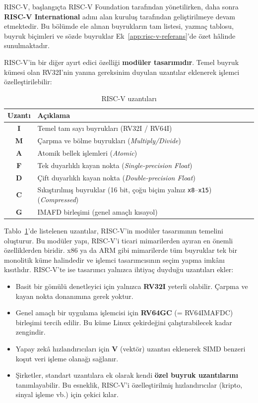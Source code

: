RISC-V, başlangıçta RISC-V Foundation tarafından yönetilirken, daha sonra \textbf{RISC-V International} adını alan kuruluş tarafından geliştirilmeye devam etmektedir. Bu bölümde ele alınan buyrukların tam listesi, yazmaç tablosu, buyruk biçimleri ve sözde buyruklar Ek~\ref{app:risc-v-referans}'de özet hâlinde sunulmaktadır.

RISC-V'in bir diğer ayırt edici özelliği \textbf{modüler tasarımıdır}. Temel buyruk kümesi olan RV32I'nin yanına gereksinim duyulan uzantılar eklenerek işlemci özelleştirilebilir:

\begin{table}[H]
\centering
\caption{RISC-V uzantıları}
\label{tab:riscv-uzantilar}
\begin{tabular}{cl}
\toprule
\textbf{Uzantı} & \textbf{Açıklama} \\
\midrule
\textbf{I} & Temel tam sayı buyrukları (RV32I / RV64I) \\
\textbf{M} & Çarpma ve bölme buyrukları (\textit{Multiply/Divide}) \\
\textbf{A} & Atomik bellek işlemleri (\textit{Atomic}) \\
\textbf{F} & Tek duyarlıklı kayan nokta (\textit{Single-precision Float}) \\
\textbf{D} & Çift duyarlıklı kayan nokta (\textit{Double-precision Float}) \\
\textbf{C} & Sıkıştırılmış buyruklar (16 bit, çoğu biçim yalnız \texttt{x8}--\texttt{x15}) (\textit{Compressed}) \\
\textbf{G} & IMAFD birleşimi (genel amaçlı kısayol) \\
\bottomrule
\end{tabular}
\end{table}

Tablo~\ref{tab:riscv-uzantilar}'de listelenen uzantılar, RISC-V'in modüler tasarımının temelini oluşturur. Bu modüler yapı, RISC-V'i ticari mimarilerden ayıran en önemli özelliklerden biridir. x86 ya da ARM gibi mimarilerde tüm buyruklar tek bir monolitik küme halindedir ve işlemci tasarımcısının seçim yapma imkânı kısıtlıdır. RISC-V'te ise tasarımcı yalnızca ihtiyaç duyduğu uzantıları ekler:
\begin{itemize}[nosep]
    \item Basit bir gömülü denetleyici için yalnızca \textbf{RV32I} yeterli olabilir. Çarpma ve kayan nokta donanımına gerek yoktur.
    \item Genel amaçlı bir uygulama işlemcisi için \textbf{RV64GC} (= RV64IMAFDC) birleşimi tercih edilir. Bu küme Linux çekirdeğini çalıştırabilecek kadar zengindir.
    \item Yapay zekâ hızlandırıcıları için \textbf{V} (vektör) uzantısı eklenerek SIMD benzeri koşut veri işleme olanağı sağlanır.
    \item Şirketler, standart uzantılara ek olarak kendi \textbf{özel buyruk uzantılarını} tanımlayabilir. Bu esneklik, RISC-V'i özelleştirilmiş hızlandırıcılar (kripto, sinyal işleme vb.) için çekici kılar.
\end{itemize}

